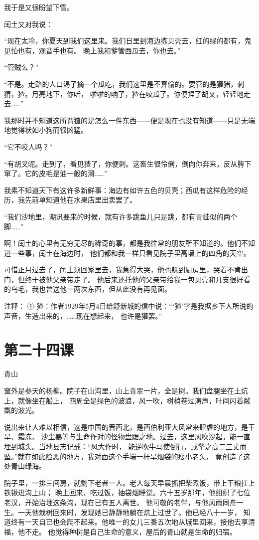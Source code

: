 \documentclass[12pt,UTF8]{ctexbook}
\begin{document}
我于是又很盼望下雪。

闰土又对我说：

“现在太冷，你夏天到我们这里来。我们日里到海边拣贝壳去，红的绿的都有，鬼见怕也有，观音手也有。
晚上我和爹管西瓜去，你也去。”

“管贼么？”

“不是。走路的人口渴了摘一个瓜吃，我们这里是不算偷的。要管的是獾猪，刺猬，猹。月亮地下，你听，
啦啦的响了，猹在咬瓜了。你便捏了胡叉，轻轻地走去……”

我那时并不知道这所谓猹的是怎么一件东西——便是现在也没有知道——只是无端地觉得状如小狗而很凶猛。

“它不咬人吗？”

“有胡叉呢。走到了，看见猹了，你便刺。这畜生很伶俐，倒向你奔来，反从胯下窜了。它的皮毛是油一般的滑……”

我素不知道天下有这许多新鲜事：海边有如许五色的贝壳；西瓜有这样危险的经历，我先前单知道他在水果店里出卖罢了。

“我们沙地里，潮汛要来的时候，就有许多跳鱼儿只是跳，都有青蛙似的两个脚……”

啊！闰土的心里有无穷无尽的稀奇的事，都是我往常的朋友所不知道的。他们不知道一些事，闰土在海边时，
他们都和我一样只看见院子里高墙上的四角的天空。

可惜正月过去了，闰土须回家里去，我急得大哭，他也躲到厨房里，哭着不肯出门，但终于被他父亲带走了。
他后来还托他的父亲带给我一包贝壳和几支很好看的鸟毛，我也曾送他一两次东西，但从此没有再见面。

注释：
① 猹：作者1929年5月4日给舒新城的信中说：“‘猹’字是我据乡下人所说的声音，生造出来的，……现在想起来，
也许是獾罢。”

\section{第二十四课}

青山

窗外是参天的杨柳。院子在山沟里，山上青翠一片，全是树。我们盘腿坐在土炕上，就像坐在船上，
四周全是绿色的波浪，风一吹，树梢卷过涛声，叶间闪着粼粼的波光。

说出来让人难以相信，这是中国的晋西北，是西伯利亚大风常来肆虐的地方，是干旱、霜冻、
沙尘暴等与生命作对的怪物盘踞之地。过去，这里风吹沙起，能一直埋到城头。当地县志记载：“风大作时，
能逆吹牛马使倒行，或擎之高二三丈而坠。”就在如此险恶的地方，我对面这个手端一杆旱烟袋的瘦小老头，
竟创造了这处青山绿海。

院子里，一排三间房，就剩下老者一人。老人每天早晨抓把柴煮饭，带上干粮扛上铁锹进沟上山；
晚上回来，吃过饭，抽袋烟睡觉。六十五岁那年，他组织了七位老汉，开始治理这条沟，现在已有五人离世。
他可敬的老伴，与他风雨同舟一生。一天他栽树回来时，发现她已静静地躺在炕上过世了。他已经八十一岁，
知道终有一天自已也会爬不起来。他唯一的女儿三番五次地从城里回来，接他去享清福，他不走。
他觉得种树是自己生命的意义，屋后的青山就是生命的归宿。
\end{document}
